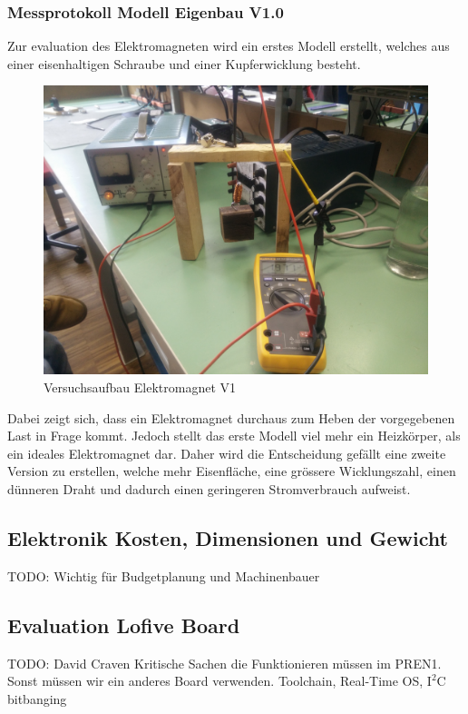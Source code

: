 \documentclass[a4paper]{report}
\begin{document}
\subsubsection{Messprotokoll Modell Eigenbau V1.0}
Zur evaluation des Elektromagneten wird ein erstes Modell erstellt, welches aus einer eisenhaltigen Schraube und einer Kupferwicklung besteht.
\begin{figure}[h!]
	\includegraphics[keepaspectratio,width=\textwidth]{Versuchsaufbau_Elektromagnet_v1}
	\caption{Versuchsaufbau Elektromagnet V1}
	\label{fig:VersuchsaufbauElektromagnet}
\end{figure}

Dabei zeigt sich, dass ein Elektromagnet durchaus zum Heben der vorgegebenen Last in Frage kommt. Jedoch stellt das erste Modell viel mehr ein Heizkörper, als ein ideales Elektromagnet dar.
Daher wird die Entscheidung gefällt eine zweite Version zu erstellen, welche mehr Eisenfläche, eine grössere Wicklungszahl, einen dünneren Draht und dadurch einen geringeren Stromverbrauch aufweist.

\subsection{Elektronik Kosten, Dimensionen und Gewicht}
TODO: Wichtig für Budgetplanung und Machinenbauer

\subsection{Evaluation Lofive Board}
TODO: David Craven
Kritische Sachen die Funktionieren müssen im PREN1. Sonst müssen wir ein anderes
Board verwenden.
Toolchain, Real-Time OS, $\text{I}^2\text{C}$ bitbanging
\end{document}
